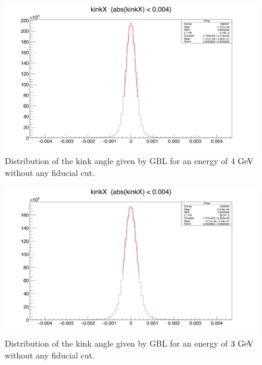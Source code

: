    \begin{figure}[!p]
     \centering
     \includegraphics[width = \textwidth]{Pictures/X0/kinkAngle4GeV.png}
     \caption{Distribution of the kink angle given by GBL for an energy of $4~\rm{GeV}$ without any fiducial cut.}
     \label{fig:kinkAngle4GeV}
   \end{figure} 

   \begin{figure}[!p]
     \centering
     \includegraphics[width = \textwidth]{Pictures/X0/kinkAngle3GeV.png}
     \caption{Distribution of the kink angle given by GBL for an energy of $3~\rm{GeV}$ without any fiducial cut.}
     \label{fig:kinkAngle3GeV}
   \end{figure} 

